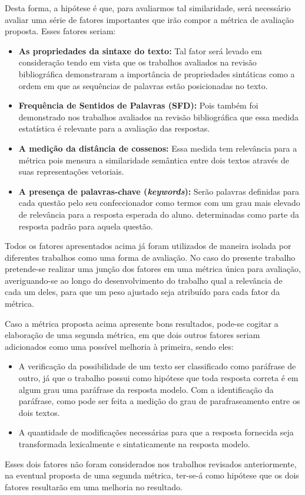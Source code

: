 Desta forma, a hipótese é que, para avaliarmos tal similaridade, será necessário avaliar uma série de fatores importantes que irão compor a métrica de avaliação proposta. Esses fatores seriam:
\begin{itemize}
    \item \textbf{As propriedades da sintaxe do texto:} Tal fator será levado em consideração tendo em vista que os trabalhos avaliados na revisão bibliográfica demonstraram a importância de propriedades sintáticas como a ordem em que as sequências de palavras estão posicionadas no texto.
    \item \textbf{Frequência de Sentidos de Palavras (SFD):} Pois também foi demonstrado nos trabalhos avaliados na revisão bibliográfica que essa medida estatística é relevante para a avaliação das respostas.
    \item \textbf{A medição da distância de cossenos:} Essa medida tem relevância para a métrica pois mensura a similaridade semântica entre dois textos através de suas representações vetoriais.
    \item \textbf{A presença de palavras-chave (\textit{keywords}):} Serão palavras definidas para cada questão pelo seu confeccionador como termos com um grau mais elevado de relevância para a resposta esperada do aluno. determinadas como parte da resposta padrão para aquela questão.
\end{itemize}

Todos os fatores apresentados acima já foram utilizados de maneira isolada por diferentes trabalhos como uma forma de avaliação. No caso do presente trabalho pretende-se realizar uma junção dos fatores em uma métrica única para avaliação, averiguando-se ao longo do desenvolvimento do trabalho qual a relevância de cada um deles, para que um peso ajustado seja atribuído para cada fator da métrica. 

Caso a métrica proposta acima apresente bons resultados, pode-se cogitar a elaboração de uma segunda métrica, em que dois outros fatores seriam adicionados como uma possível melhoria à primeira, sendo eles: 
\begin{itemize}
    \item A verificação da possibilidade de um texto ser classificado como paráfrase de outro, já que o trabalho possui como hipótese que toda resposta correta é em algum grau uma paráfrase da resposta modelo. Com a identificação da paráfrase, como pode ser feita a medição do grau de parafraseamento entre os dois textos.
    \item A quantidade de modificações necessárias para que a resposta fornecida seja transformada lexicalmente e sintaticamente na resposta modelo.
\end{itemize}
Esses dois fatores não foram considerados nos trabalhos revisados anteriormente, na eventual proposta de uma segunda métrica, ter-se-á como hipótese que os dois fatores resultarão em uma melhoria no resultado.

